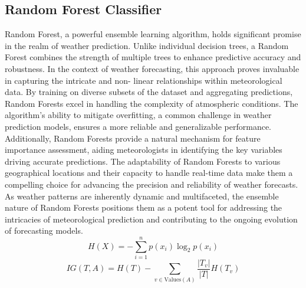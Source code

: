 \documentclass[conference, onecolumn]{IEEEtran}
\begin{document}
\subsection{\textbf{Random Forest Classifier}}
Random Forest, a powerful ensemble learning algorithm, holds significant promise in the realm of 	weather prediction. Unlike individual decision trees, 	a Random Forest combines the strength of multiple 	trees to enhance predictive accuracy and robustness. 	In the context of weather forecasting, this approach 	proves invaluable in capturing the intricate and non-	linear relationships within meteorological data. By 	training on diverse subsets of the dataset and 	aggregating predictions, Random Forests excel in 	handling the complexity of atmospheric conditions. 	The algorithm's ability to mitigate overfitting, a 	common challenge in weather prediction models, 	ensures a more reliable and generalizable 	performance. Additionally, Random Forests provide 	a natural mechanism for feature importance 	assessment, aiding meteorologists in identifying the 	key variables driving accurate predictions. The 	adaptability of Random Forests to various 	geographical locations and their capacity to handle 	real-time data make them a compelling choice for 	advancing the precision and reliability of weather 	forecasts. As weather patterns are inherently 	dynamic and multifaceted, the ensemble nature of 	Random Forests positions them as a potent tool for 	addressing the intricacies of meteorological 	prediction and contributing to the ongoing evolution 	of forecasting models.
\\  \[ H(X) = - \sum_{i=1}^{n} p(x_i) \log_2 p(x_i) \]
\[ IG(T, A) = H(T) - \sum_{v \in \text{Values}(A)} \frac{|T_v|}{|T|} H(T_v) \]
\end{document}
